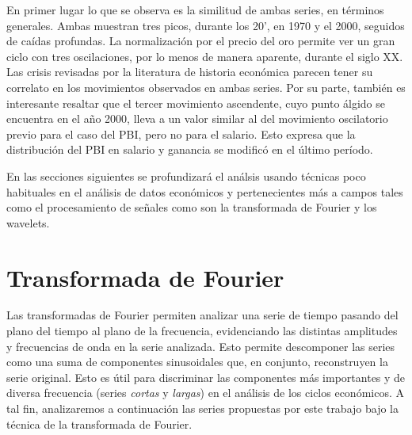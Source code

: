 \documentclass[a4paper]{article}
\begin{document}
En primer lugar lo que se observa es la similitud de ambas series, en términos generales. Ambas muestran tres picos, durante los 20', en 1970 y el 2000, seguidos de caídas profundas. La normalización por el precio del oro permite ver un gran ciclo con tres oscilaciones, por lo menos de manera aparente, durante el siglo XX. Las crisis revisadas por la literatura de historia económica parecen tener su correlato en los movimientos observados en ambas series. Por su parte, también es interesante resaltar que el tercer movimiento ascendente, cuyo punto álgido se encuentra en el año 2000, lleva a un valor similar al del movimiento oscilatorio previo para el caso del PBI, pero no para el salario. Esto expresa que la distribución del PBI en salario y ganancia se modificó en el último período. 

En las secciones siguientes se profundizará el análsis usando técnicas poco habituales en el análisis de datos económicos y pertenecientes más a campos tales como el procesamiento de señales como son la transformada 
de Fourier y los wavelets.

\section{Transformada de Fourier}
Las transformadas de Fourier permiten analizar una serie de tiempo pasando del plano del tiempo al plano de la frecuencia, evidenciando las distintas amplitudes y frecuencias de onda en la serie analizada. Esto permite descomponer las series como una suma de componentes sinusoidales que, en conjunto, reconstruyen la serie original. Esto es útil para discriminar las componentes más importantes y de diversa frecuencia (series \textit{cortas} y \textit{largas}) en el análisis de los ciclos económicos. A tal fin, analizaremos a continuación las series propuestas por este trabajo bajo la técnica de la transformada de Fourier.
\end{document}
